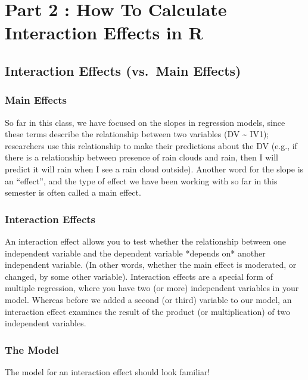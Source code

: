 \documentclass[
  letterpaper,
  DIV=11,
  numbers=noendperiod,
  oneside]{scrreprt}
\begin{document}
\chapter{Part 2 : How To Calculate Interaction Effects in
R}\label{part-2-how-to-calculate-interaction-effects-in-r}

\section{Interaction Effects (vs.~Main
Effects)}\label{interaction-effects-vs.-main-effects}

\subsection{Main Effects}\label{main-effects}

So far in this class, we have focused on the slopes in regression
models, since these terms describe the relationship between two
variables (DV \textasciitilde{} IV1); researchers use this relationship
to make their predictions about the DV (e.g., if there is a relationship
between presence of rain clouds and rain, then I will predict it will
rain when I see a rain cloud outside). Another word for the slope is an
``effect'', and the type of effect we have been working with so far in
this semester is often called a main effect.

\subsection{Interaction Effects}\label{interaction-effects-1}

An interaction effect allows you to test whether the relationship
between one independent variable and the dependent variable *depends on*
another independent variable. (In other words, whether the main effect
is moderated, or changed, by some other variable). Interaction effects
are a special form of multiple regression, where you have two (or more)
independent variables in your model. Whereas before we added a second
(or third) variable to our model, an interaction effect examines the
result of the product (or multiplication) of two independent variables.~

\subsection{The Model}\label{the-model}

The model for an interaction effect should look familiar!
\end{document}
